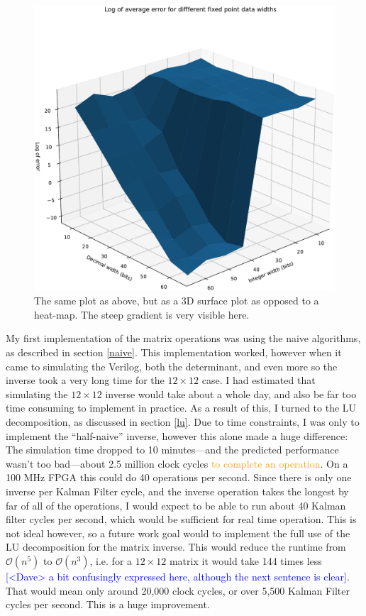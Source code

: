 \documentclass[12pt]{article}
\newcommand{\note}[2][red]{\textcolor{#1}{#2}}
\newcommand{\notedme}[1]{\note[blue]{[<Dave> #1]}}
\newcommand{\change}[2][]{\textcolor{orange}{#2}}
\begin{document}
\begin{figure}[thp]
	\centering
	
	\includegraphics[width=\textwidth]{sfc_plot_full.pdf}
	
	\caption{The same plot as above, but as a 3D surface plot as opposed to a heat-map. The steep gradient is very visible here.}
	\label{full_sfc}
\end{figure}

My first implementation of the matrix operations was using the naive algorithms, as described in section \ref{naive}. This implementation worked, however when it came to simulating the Verilog, both the determinant, and even more so the inverse took a very long time for the $12 \times 12$ case. I had estimated that simulating the $12 \times 12$ inverse would take about a whole day, and also be far too time consuming to implement in practice. As a result of this, I turned to the LU decomposition, as discussed in section \ref{lu}. Due to time constraints, I was only to implement the ``half-naive'' inverse, however this alone made a huge difference: The simulation time dropped to 10 minutes---and the predicted performance wasn't too bad---about 2.5 million clock cycles \change{to complete an operation}. On a 100 MHz FPGA this could do 40 operations per second. Since there is only one inverse per Kalman Filter cycle, and the inverse operation takes the longest by far of all of the operations, I would expect to be able to run about 40 Kalman filter cycles per second, which would be sufficient for real time operation. This is not ideal however, so a future work goal would to implement the full use of the LU decomposition for the matrix inverse. This would reduce the runtime from $\mathcal{O}(n^5)$ to $\mathcal{O}(n^3)$, i.e. for a $12 \times 12$ matrix it would take 144 times less \notedme{a bit confusingly expressed here, although the next sentence is clear}. That would mean only around 20,000 clock cycles, or over 5,500 Kalman Filter cycles per second. This is a huge improvement.
\end{document}
